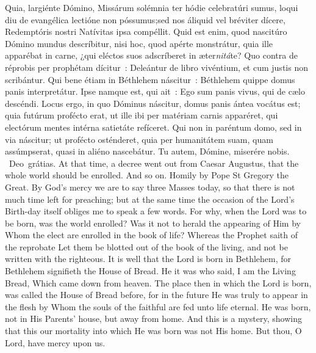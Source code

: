 {{    \begin{parcolumns}[rulebetween,colwidths={1=.47\linewidth}]{2}
    {Quia, largiénte Dómino, Missárum solémnia ter hódie celebratúri sumus, loqui diu de evangélica lectióne non póssumus;}{sed nos áliquid vel bréviter dícere, Redemptóris nostri Natívitas ipsa compéllit. Quid est enim, quod nascitúro Dómino mundus descríbitur, nisi hoc, quod apérte monstrátur, quia ille apparébat in carne, ¿qui eléctos suos adscríberet in æter\emph{nitá}te? Quo contra de réprobis per prophétam dícitur~: Deleántur de libro vivéntium, et cum justis non scribántur. Qui bene étiam in Béthlehem náscitur~: Béthlehem quippe domus panis interpretátur. Ipse namque est, qui ait~: Ego sum panis vivus, qui de cælo descéndi. Locus ergo, in quo Dóminus náscitur, domus panis ántea vocátus est; quia futúrum profécto erat, ut ille ibi per matériam carnis apparéret, qui electórum mentes intérna satietáte refíceret. Qui non in paréntum domo, sed in via náscitur; ut profécto osténderet, quia per humanitátem suam, quam assúmpserat, quasi in aliéno nascebátur.
      Tu autem, Dómine, miserére nobis.
      \Rbar{}~Deo~grátias.}
    {At that time, a decree went out from Caesar Augustus, that the whole world should be enrolled. And so on.}
    {Homily by Pope St Gregory the Great.}
    {By God's mercy we are to say three Masses today, so that there is not much time left for preaching; but at the same time the occasion of the Lord's Birth-day itself obliges me to speak a few words. For why, when the Lord was to be born, was the world enrolled? Was it not to herald the appearing of Him by Whom the elect are enrolled in the book of life? Whereas the Prophet saith of the reprobate Let them be blotted out of the book of the living, and not be written with the righteous. It is well that the Lord is born in Bethlehem, for Bethlehem signifieth the House of Bread. He it was who said, I am the Living Bread, Which came down from heaven. The place then in which the Lord is born, was called the House of Bread before, for in the future He was truly to appear in the flesh by Whom the souls of the faithful are fed unto life eternal. He was born, not in His Parents' house, but away from home. And this is a mystery, showing that this our mortality into which He was born was not His home.
      But thou, O Lord, have mercy upon us.}
    \end{parcolumns}

}}
